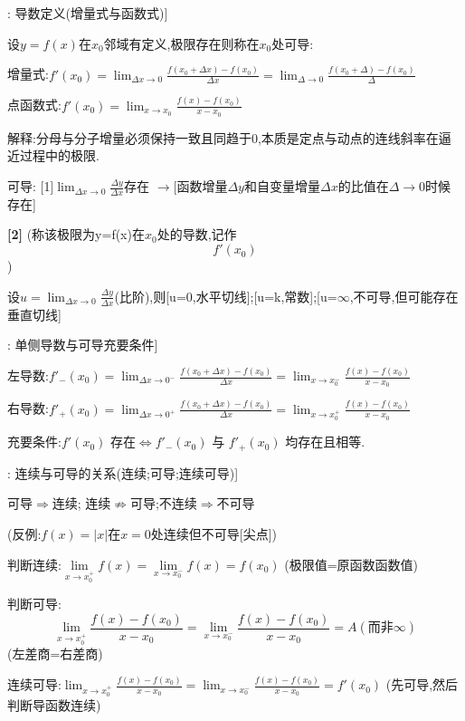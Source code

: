 \documentclass[11pt,a4paper,UTF8]{ctexart}
\begin{document}
\begin{thmbox}[原理[1]: 导数定义(增量式与函数式)]

设$y=f(x)$在$x_0$邻域有定义,极限存在则称在$x_0$处可导:

  增量式:$f'(x_0) = \lim_{\Delta x \to 0} \frac{f(x_0+\Delta x) - f(x_0)}{\Delta x} = \lim_{\Delta \to 0} \frac{f(x_0+\Delta) - f(x_0)}{\Delta}$

  点函数式:$f'(x_0) = \lim_{x \to x_0} \frac{f(x) - f(x_0)}{x - x_0}$

  解释:分母与分子增量必须保持一致且同趋于0,本质是定点与动点的连线斜率在逼近过程中的极限.

可导:	[1]$\lim_{\Delta x \to 0} \frac{\Delta y}{\Delta x}$存在			$\to$[函数增量$\Delta y$和自变量增量$\Delta x$的比值在$\Delta\to0$时候存在]

\textbf{[2]} (称该极限为y=f(x)在$x_0$处的导数,记作
\begin{equation*}
f'(x_0)
\end{equation*}
)

设$u=\lim_{\Delta x \to 0} \frac{\Delta y}{\Delta x}$(比阶),则[u=0,水平切线];[u=k,常数];[u=$\infty$,不可导,但可能存在垂直切线]

\end{thmbox}
\begin{thmbox}[原理[2]: 单侧导数与可导充要条件]

  左导数:$f'_-(x_0) = \lim_{\Delta x \to 0^-} \frac{f(x_0+\Delta x) - f(x_0)}{\Delta x} = \lim_{x \to x_0^-} \frac{f(x) - f(x_0)}{x - x_0}$

  右导数:$f'_+(x_0) = \lim_{\Delta x \to 0^+} \frac{f(x_0+\Delta x) - f(x_0)}{\Delta x} = \lim_{x \to x_0^+} \frac{f(x) - f(x_0)}{x - x_0}$

  充要条件:$f'(x_0) \text{ 存在} \iff f'_-(x_0) \text{ 与 } f'_+(x_0) \text{ 均存在且相等}$.

\end{thmbox}
\begin{thmbox}[原理[3]: 连续与可导的关系(连续;可导;连续可导)]

可导$\Rightarrow$连续; 连续$\not\Rightarrow$可导;不连续$\Rightarrow$不可导

  (反例:$f(x)=|x|$在$x=0$处连续但不可导[尖点])

  判断连续:$\lim\limits_{x \to x_0^+} f(x)=\lim\limits_{x \to x_0^-} f(x)= f(x_0)$				   (极限值=原函数函数值)

  判断可导:
\begin{equation*}
\lim_{x \to x_0^+} \frac{f(x) - f(x_0)}{x - x_0}= \lim_{x \to x_0^-} \frac{f(x) - f(x_0)}{x - x_0}=A(\text{而非}\infty)
\end{equation*}
		 (左差商=右差商)

  连续可导:$\lim_{x \to x_0^+} \frac{f(x) - f(x_0)}{x - x_0}= \lim_{x \to x_0^-} \frac{f(x) - f(x_0)}{x - x_0} = f'(x_0)$		    (先可导,然后判断导函数连续)

\end{thmbox}
\end{document}
